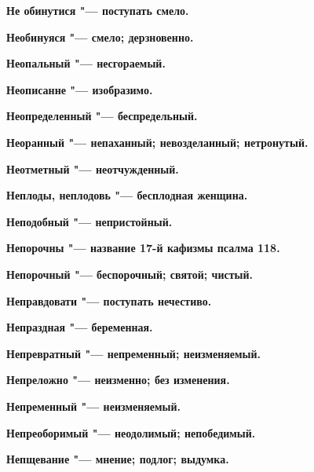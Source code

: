 \begin{mymulticols}{2}
\bfseries Не обинутися\normalfont{} "--- поступать смело. 




\bfseries Необинуяся\normalfont{} "--- смело; дерзновенно. 




\bfseries Неопальный\normalfont{} "--- несгораемый. 




\bfseries Неописанне\normalfont{} "--- изобразимо. 




\bfseries Неопределенный\normalfont{} "--- беспредельный. 




\bfseries Неоранный\normalfont{} "--- непаханный; невозделанный; нетронутый. 




\bfseries Неотметный\normalfont{} "--- неотчужденный. 




\bfseries Неплоды, неплодовь\normalfont{} "--- бесплодная женщина. 




\bfseries Неподобный\normalfont{} "--- непристойный. 




\bfseries Непорочны\normalfont{} "--- название 17-й кафизмы псалма 118. 




\bfseries Непорочный\normalfont{} "--- беспорочный; святой; чистый. 




\bfseries Неправдовати\normalfont{} "--- поступать нечестиво. 




\bfseries Непраздная\normalfont{} "--- беременная. 




\bfseries Непревратный\normalfont{} "--- непременный; неизменяемый. 




\bfseries Непреложно\normalfont{} "--- неизменно; без изменения. 




\bfseries Непременный\normalfont{} "--- неизменяемый. 




\bfseries Непреоборимый\normalfont{} "--- неодолимый; непобедимый. 




\bfseries Непщевание\normalfont{} "--- мнение; подлог; выдумка. 





\end{mymulticols}
